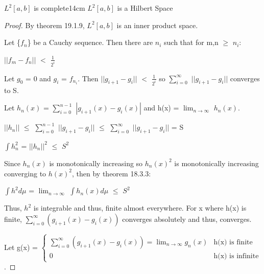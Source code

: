     \newpage



    \begin{wtheorem}{$L^2[a,b]$ is complete}{14cm}
        $L^2[a,b]$ is a Hilbert Space
    \end{wtheorem}

    \begin{proof}
        By {\color{red} theorem 19.1.9}, $L^2[a,b]$ is an inner product space.

        Let \{$f_n$\} be a Cauchy sequence.
        Then there are $n_i$ such that for m,n $\geq$ $n_i$:

        \hspace{0.5cm}
        $||f_m - f_n||$ $<$ $\frac{1}{2^i}$

        Let $g_0$ = 0 and $g_i$ = $f_{n_i}$.
        Then $||g_{i+1} - g_i||$ $<$ $\frac{1}{2^i}$
        so $\sum_{i=0}^{\infty}$ $||g_{i+1} - g_i||$ converges to S.

        Let $h_n(x)$ = $\sum_{i=0}^{n-1}$ $|g_{i+1}(x) - g_i(x)|$
        and h(x) = $\lim_{n \rightarrow \infty}$ $h_n(x)$.

        \hspace{0.5cm}
        $||h_n||$
        $\leq$ $\sum_{i=0}^{n-1}$ $||g_{i+1} - g_i||$
        $\leq$ $\sum_{i=0}^{\infty}$ $||g_{i+1} - g_i||$
        = S

        \hspace{0.5cm}
        $\int h_n^2$ = $||h_n||^2$ $\leq$ $S^2$

        Since $h_n(x)$ is monotonically increasing
        so $h_n(x)^2$ is monotonically increasing converging to $h(x)^2$,
        then by {\color{red} theorem 18.3.3}:

        \hspace{0.5cm}
        $\int h^2 d\mu$ = $\lim_{n \rightarrow \infty}$ $\int h_n(x) d\mu$
        $\leq$ $S^2$

        Thus, $h^2$ is integrable and thus, finite almost everywhere.
        For x where h(x) is finite, $\sum_{i=0}^{\infty} (g_{i+1}(x) - g_i(x))$
        converges absolutely and thus, converges.
        
        Let g(x) =
        $\begin{cases}
            \sum_{i=0}^{\infty} (g_{i+1}(x) - g_i(x))
                = \lim_{n \rightarrow \infty} g_n(x) & \text{h(x) is finite} \\
            0 & \text{h(x) is infinite}
        \end{cases}$.


\end{proof}
